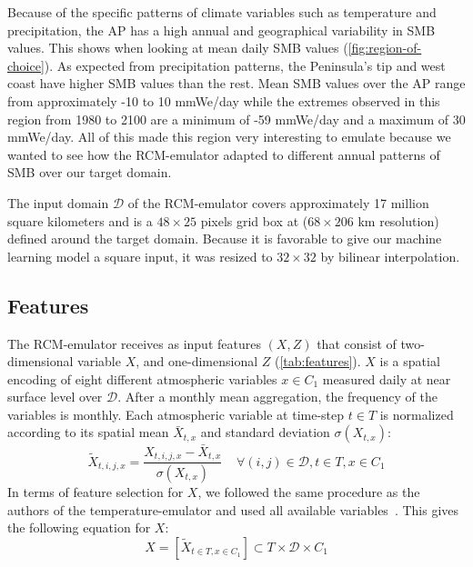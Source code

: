 \documentclass[a4paper,11pt,oneside]{report}
\begin{document}
 Because of the specific patterns of climate variables such as temperature and precipitation, the AP has a high annual and geographical variability in SMB values. This shows when looking at mean daily SMB values (\autoref{fig:region-of-choice}). As expected from precipitation patterns, the Peninsula's tip and west coast have higher SMB values than the rest. Mean SMB values over the AP range from approximately -10 to 10 \si{mmWe/day} while the extremes observed in this region from 1980 to 2100 are a minimum of -59 \si{mmWe/day} and a maximum of 30 \si{mmWe/day}. All of this made this region very interesting to emulate because we wanted to see how the RCM-emulator adapted to different annual patterns of SMB over our target domain. 
 
 The input domain $\mathcal{D}$ of the RCM-emulator covers approximately 17 million square kilometers and is a $48\times25$ pixels grid box at ($68 \times 206$ \si{km} resolution) defined around the target domain. Because it is favorable to give our machine learning model a square input, it was resized to $32\times 32$ by bilinear interpolation. 



\subsection{Features}\label{subsec:features}

The RCM-emulator receives as input features $(X, Z)$ that consist of two-dimensional variable $X$, and one-dimensional $Z$ (\autoref{tab:features}). $X$ is a spatial encoding of eight different atmospheric variables $x\in C_1$ measured daily at near surface level over $\mathcal{D}$. After a monthly mean aggregation, the frequency of the variables is monthly. Each atmospheric variable at time-step $t\in T$ is normalized according to its spatial mean $\bar{X}_{t,x}$ and standard deviation $\sigma(X_{t,x})$:
\begin{equation}\label{eq:normalisation-X}
            \tilde{X}_{t,i,j,x} = \frac{X_{t,i,j,x}-\bar{X}_{t,x}}{\sigma(X_{t,x})} \;\;\;\; \forall (i,j) \in \mathcal{D}, t\in T, x\in C_1
\end{equation}
In terms of feature selection for $X$, we followed the same procedure as the authors of the temperature-emulator and used all available variables~\cite{Doury}. This gives the following equation for $X$:
\begin{equation}\label{eq:X}
    X = \left[\tilde{X}_{t\in T, x\in C_1} \right] \subset T \times \mathcal{D} \times C_1
\end{equation}
\end{document}
